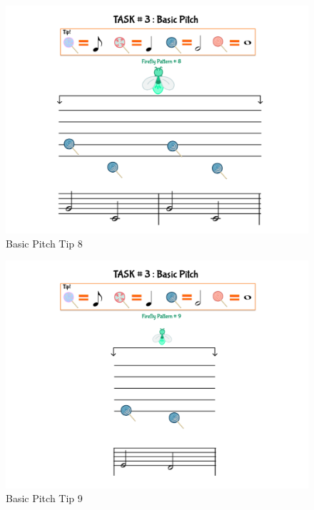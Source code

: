 \begin{figure}[H]
    \centering
    \includegraphics[width=12cm]{figures/NewFigures/BasicPitchTip8.png}
    \caption{Basic Pitch Tip 8}
    \label{fig:BasicPitchTip8}
\end{figure}

\begin{figure}[H]
    \centering
    \includegraphics[width=12cm]{figures/NewFigures/BasicPitchTip9.png}
    \caption{Basic Pitch Tip 9}
    \label{fig:BasicPitchTip9}
\end{figure}

